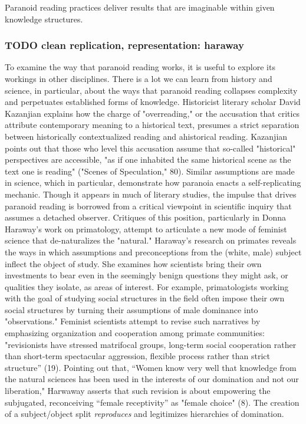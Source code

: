 \documentclass[11pt]{article}
\begin{document}
Paranoid reading practices deliver results that are imaginable within
given knowledge structures.

\subsubsection{{\bfseries\sffamily TODO} clean replication, representation: haraway}
\label{sec:org58c48bb}

To examine the way that paranoid reading works, it is useful to
explore its workings in other disciplines. There is a lot we can learn
from history and science, in particular, about the ways that paranoid
reading collapses complexity and perpetuates established forms of
knowledge. Historicist literary scholar David Kazanjian explains how
the charge of "overreading," or the accusation that critics attribute
contemporary meaning to a historical text, presumes a strict
separation between historically contextualized reading and ahistorical
reading. Kazanjian points out that those who level this accusation
assume that so-called "historical" perspectives are accessible, "as if
one inhabited the same historical scene as the text one is reading"
("Scenes of Speculation," 80). Similar assumptions are made in
science, which in particular, demonstrate how paranoia enacts a
self-replicating mechanic. Though it appears in much of literary
studies, the impulse that drives paranoid reading is borrowed from a
critical viewpoint in scientific inquiry that assumes a detached
observer. Critiques of this position, particularly in Donna Haraway's
work on primatology, attempt to articulate a new mode of feminist
science that de-naturalizes the "natural." Haraway's research on
primates reveals the ways in which assumptions and preconceptions from
the (white, male) subject inflect the object of study. She examines
how scientists bring their own investments to bear even in the
seemingly benign questions they might ask, or qualities they isolate,
as areas of interest. For example, primatologists working with the
goal of studying social structures in the field often impose their own
social structures by turning their assumptions of male dominance into
"observations." Feminist scientists attempt to revise such narratives
by emphasizing organization and cooperation among primate communities:
"revisionists have stressed matrifocal groups, long-term social
cooperation rather than short-term spectacular aggression, flexible
process rather than strict structure” (19). Pointing out that, “Women
know very well that knowledge from the natural sciences has been used
in the interests of our domination and not our liberation," Harwaway
asserts that such revision is about empowering the subjugated,
reconceiving “female receptivity” as "female choice" (8). The creation
of a subject/object split \emph{reproduces} and legitimizes hierarchies of
domination.
\end{document}

